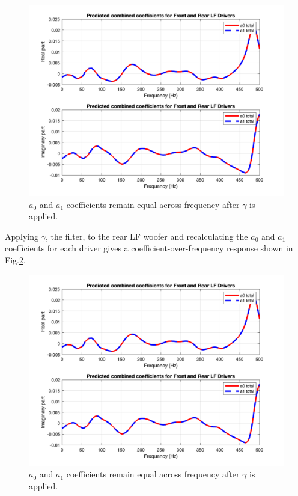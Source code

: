\documentclass{report}
\begin{document}
            \begin{figure}[H]
                \centering
                \includegraphics[scale=0.35]{figs/coeffsPredicted.png}%
                \caption{$a_0$ and $a_1$ coefficients remain equal across frequency after $\gamma$ is applied.}
                \label{coeffsPredicted}
            \end{figure}
        Applying $\gamma$, the filter, to the rear LF woofer and recalculating the $a_0$ and $a_1$ coefficients for each driver gives a coefficient-over-frequency response shown in Fig.\ref{coeffsPredicted}.
        \begin{figure}[H]
            \centering
            \includegraphics[scale=0.35]{figs/coeffsPredicted.png}%
            \caption{$a_0$ and $a_1$ coefficients remain equal across frequency after $\gamma$ is applied.}
            \label{coeffsPredicted}
        \end{figure}
\end{document}
